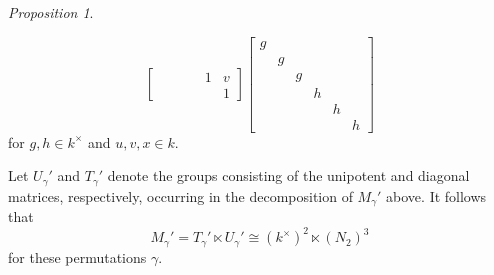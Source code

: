 \documentclass[12pt]{amsart}
\theoremstyle{Theorem}
\theoremstyle{Theorem}
\theoremstyle{Theorem}
\theoremstyle{Theorem}
\theoremstyle{Plain}
\theoremstyle{remark}
\theoremstyle{remark}
\theoremstyle{Definition}
\newtheorem{prpd}[dfn]{Proposition}
\begin{document}
\begin{prpd}
\begin{itemize}
\[\begin{bmatrix}
                  &   &   &   & 1 & v\\
                  &   &   &   &   & 1
            \end{bmatrix}
            \begin{bmatrix}
                g &   &   &   &   &  \\
                  & g &   &   &   &  \\
                  &   & g &   &   &  \\
                  &   &   & h &   &  \\
                  &   &   &   & h &  \\
                  &   &   &   &   & h
            \end{bmatrix}
        \]
        for $ g, h \in k^\times $ and $ u, v, x \in k $.
    \end{itemize}
    Let $U_\gamma'$ and $T_\gamma'$ denote the groups consisting of the unipotent and diagonal matrices, respectively, occurring in the decomposition of $M_\gamma'$ above. It follows that
    \[
        M_\gamma' = T_\gamma' \ltimes U_\gamma' \cong ( k^\times )^2 \ltimes ( N_2 )^3
    \]
    for these permutations $\gamma$.
\end{prpd}
\end{document}
